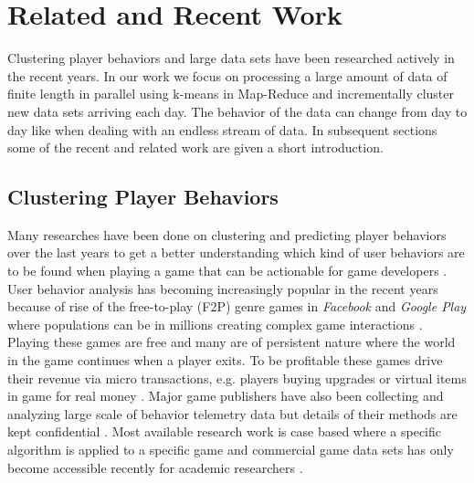 
\chapter{Related and Recent Work} %
\label{Chapter3}

Clustering player behaviors and large data sets have been researched actively in the recent years. In our work we focus on processing a large amount of data of finite length in parallel using k-means in Map-Reduce and incrementally cluster new data sets arriving each day. The behavior of the data can change from day to day like when dealing with an endless stream of data. In subsequent sections some of the recent and related work are given a short introduction.

\section{Clustering Player Behaviors}
Many researches have been done on clustering and predicting player behaviors over the last years to get a better understanding which kind of user behaviors are to be found when playing a game that can be actionable for game developers \citep{Marsh:2006Continuous, Missura2009Player, Thurau:2009SVIM, Drachen:2011Evaluating, Drachen:2012}. User behavior analysis has becoming increasingly popular in the recent years because of rise of the free-to-play (F2P) genre games in \textit{Facebook} and \textit{Google Play} where populations can be in millions creating complex game interactions \citep{Kim:2008Tracking, Drachen:2011Evaluating}. Playing these games are free and many are of persistent nature where the world in the game continues when a player exits. To be profitable these games drive their revenue via micro transactions, e.g. players buying upgrades or virtual items in game for real money \citep{Kim:2008Tracking, Drachen:2011Evaluating, Fields:2011SocialGame, Seif:2013GameAnalytics}. Major game publishers have also been collecting and analyzing large scale of behavior telemetry data but details of their methods are kept confidential \citep{Zoeller:2010, Yannakakis:2012}. Most available research work is case based where a specific algorithm is applied to a specific game and commercial game data sets has only become accessible recently for academic researchers \citep{Yannakakis:2012}.


